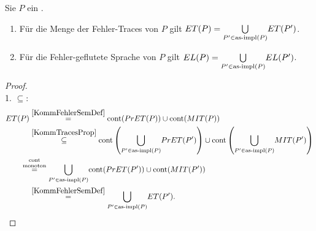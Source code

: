 \begin{Prop}
  \label{KommSemProp}
  Sie $P$ ein \MEIO{}.
  \begin{enumerate}
    \item Für die Menge der Fehler-Traces von $P$ gilt $ET (P) =
      \underset{P'\in\mathrm{as}\text{-}\mathrm{impl} (P)}{\bigcup} ET (P')$.
    \item Für die Fehler-geflutete Sprache von $P$ gilt $EL (P) =
      \underset{P'\in\mathrm{as}\text{-}\mathrm{impl} (P)}{\bigcup} EL (P')$.
  \end{enumerate}
\end{Prop}
\begin{proof}\mbox{}\\
  1. \glqq$\subseteq$\grqq{}:
  \begin{align*}
    \ET (P)&\overset{\ref{KommFehlerSemDef}}{=} \cont (\PrET (P))\cup \cont
    (\MIT (P))\\
    &\overset{\ref{KommTracesProp}}{\subseteq} \cont
    \left(\underset{P'\in\asimp (P)}{\bigcup} \PrET (P')\right)\cup \cont
    \left(\underset{P'\in\asimp (P)}{\bigcup} \MIT (P')\right)\\
    &\hspace{-0.4cm}\overset{\cont}{\overset{\text{monoton}}{=}} \underset{P'\in\asimp
    (P)}{\bigcup} \cont (\PrET (P'))\cup \cont (\MIT (P'))\\
    &\overset{\ref{KommFehlerSemDef}}{=} \underset{P'\in\asimp
    (P)}{\bigcup} \ET (P').\\
  \end{align*}


\end{proof}
